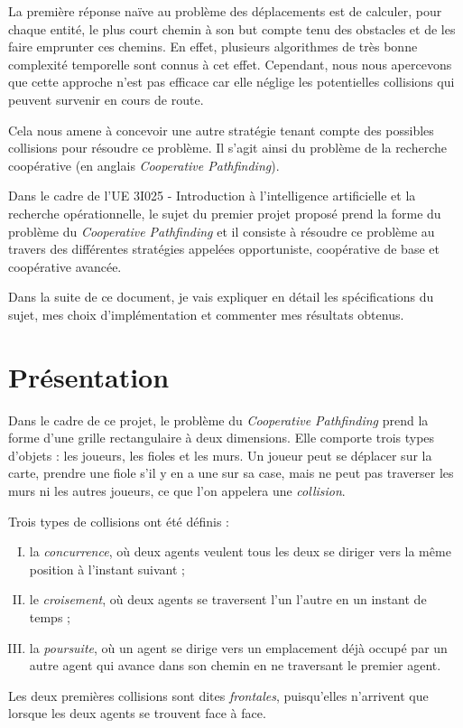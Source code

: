 \documentclass[12pt,a4paper]{article}
\begin{document}
La premi\`ere r\'eponse na\"ive au probl\`eme des d\'eplacements est de calculer, pour chaque entit\'e, le plus court chemin \`a son but compte tenu des obstacles et de les faire emprunter ces chemins.
En effet, plusieurs algorithmes de tr\`es bonne complexit\'e temporelle  sont connus \`a cet effet.
Cependant, nous nous apercevons que cette approche n'est pas efficace car elle n\'eglige les potentielles collisions qui peuvent survenir en cours de route.

Cela nous amene \`a concevoir une autre strat\'egie tenant compte des possibles collisions pour r\'esoudre ce probl\`eme.
Il s'agit ainsi du probl\`eme de la recherche coop\'erative (en anglais \textit{Cooperative Pathfinding}).

Dans le cadre de l'UE 3I025 - Introduction \`a l'intelligence artificielle et la recherche op\'erationnelle, le sujet du premier projet propos\'e prend la forme du probl\`eme du \textit{Cooperative Pathfinding} et il consiste \`a r\'esoudre ce probl\`eme au travers des diff\'erentes strat\'egies appel\'ees opportuniste, coop\'erative de base et coop\'erative avanc\'ee.

Dans la suite de ce document, je vais expliquer en d\'etail les sp\'ecifications du sujet, mes choix d'impl\'ementation et commenter mes r\'esultats obtenus.

\newpage
\part{Pr\'esentation}
Dans le cadre de ce projet, le probl\`eme du \textit{Cooperative Pathfinding} prend la forme d'une grille rectangulaire \`a deux dimensions.
Elle comporte trois types d'objets : les joueurs, les fioles et les murs.
Un joueur peut se d\'eplacer sur la carte, prendre une fiole s'il y en a une sur sa case, mais ne peut pas traverser les murs ni les autres joueurs, ce que l'on appelera une \textit{collision}.

Trois types de collisions ont \'et\'e d\'efinis :
\begin{enumerate}[(I)]
 \item la \textit{concurrence}, o\`u deux agents veulent tous les deux se diriger vers la m\^eme position \`a l'instant suivant ;
 \item le \textit{croisement}, o\`u deux agents se traversent l'un l'autre en un instant de temps ;
 \item la \textit{poursuite}, o\`u un agent se dirige vers un emplacement d\'ej\`a occup\'e par un autre agent qui avance dans son chemin en ne traversant le premier agent. 
\end{enumerate}
Les deux premi\`eres collisions sont dites \textit{frontales}, puisqu'elles n'arrivent que lorsque les deux agents se trouvent face \`a face.
\end{document}
